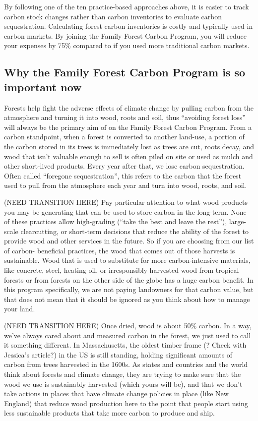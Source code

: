 \documentclass{article}\usepackage[]{graphicx}\usepackage[]{color}
\begin{document}
By following one of the ten practice-based approaches above, it is easier to track carbon stock changes rather than carbon inventories to evaluate carbon sequestration. Calculating forest carbon inventories is costly and typically used in carbon markets. By joining the Family Forest Carbon Program, you will reduce your expenses by 75\% compared to if you used more traditional carbon markets. 


\subsection*{Why the Family Forest Carbon Program is so important now}

Forests help fight the adverse effects of climate change by pulling carbon from the atmosphere and turning it into wood, roots and soil, thus ``avoiding forest loss'' will always be the primary aim of on the Family Forest Carbon Program. From a carbon standpoint, when a forest is converted to another land-use, a portion of the carbon stored in its trees is immediately lost as trees are cut, roots decay, and wood that isn't valuable enough to sell is often piled on site or used as mulch and other short-lived products. Every year after that, we lose carbon sequestration. Often called ``foregone sequestration'', this refers to the carbon that the forest used to pull from the atmosphere each year and turn into wood, roots, and soil.

(NEED TRANSITION HERE)
Pay particular attention to what wood products you may be generating that can be used to store carbon in the long-term. None of these practices allow high-grading (``take the best and leave the rest''), large-scale clearcutting, or short-term decisions that reduce the ability of the forest to provide wood and other services in the future. So if you are choosing from our list of carbon- beneficial practices, the wood that comes out of those harvests is sustainable. Wood that is used to substitute for more carbon-intensive materials, like concrete, steel, heating oil, or irresponsibly harvested wood from tropical forests or from forests on the other side of the globe has a huge carbon benefit. In this program specifically, we are not paying landowners for that carbon value, but that does not mean that it should be ignored as you think about how to manage your land.

(NEED TRANSITION HERE)
Once dried, wood is about 50\% carbon. In a way, we've always cared about and measured carbon in the forest, we just used to call it something different. In Massachusetts, the oldest timber frame (? Check with Jessica's article?) in the US is still standing, holding significant amounts of carbon from trees harvested in the 1600s. As states and countries and the world think about forests and climate change, they are trying to make sure that the wood we use is sustainably harvested (which yours will be), and that we don’t take actions in places that have climate change policies in place (like New England) that reduce wood production here to the point that people start using less sustainable products that take more carbon to produce and ship.
\end{document}
